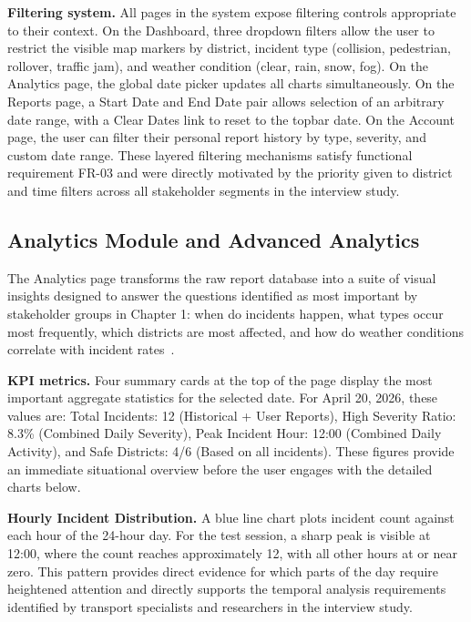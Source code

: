 \documentclass[12pt,a4paper]{report}
\begin{document}
\textbf{Filtering system.} All pages in the system expose filtering controls appropriate to their context. On the Dashboard, three dropdown filters allow the user to restrict the visible map markers by district, incident type (collision, pedestrian, rollover, traffic jam), and weather condition (clear, rain, snow, fog). On the Analytics page, the global date picker updates all charts simultaneously. On the Reports page, a Start Date and End Date pair allows selection of an arbitrary date range, with a Clear Dates link to reset to the topbar date. On the Account page, the user can filter their personal report history by type, severity, and custom date range. These layered filtering mechanisms satisfy functional requirement FR-03 and were directly motivated by the priority given to district and time filters across all stakeholder segments in the interview study.

\subsection{Analytics Module and Advanced Analytics}

The Analytics page transforms the raw report database into a suite of visual insights designed to answer the questions identified as most important by stakeholder groups in Chapter 1: when do incidents happen, what types occur most frequently, which districts are most affected, and how do weather conditions correlate with incident rates~\cite{shu2023, miranda2024}.

\textbf{KPI metrics.} Four summary cards at the top of the page display the most important aggregate statistics for the selected date. For April 20, 2026, these values are: Total Incidents: 12 (Historical + User Reports), High Severity Ratio: 8.3\% (Combined Daily Severity), Peak Incident Hour: 12:00 (Combined Daily Activity), and Safe Districts: 4/6 (Based on all incidents). These figures provide an immediate situational overview before the user engages with the detailed charts below.

\textbf{Hourly Incident Distribution.} A blue line chart plots incident count against each hour of the 24-hour day. For the test session, a sharp peak is visible at 12:00, where the count reaches approximately 12, with all other hours at or near zero. This pattern provides direct evidence for which parts of the day require heightened attention and directly supports the temporal analysis requirements identified by transport specialists and researchers in the interview study.
\end{document}
